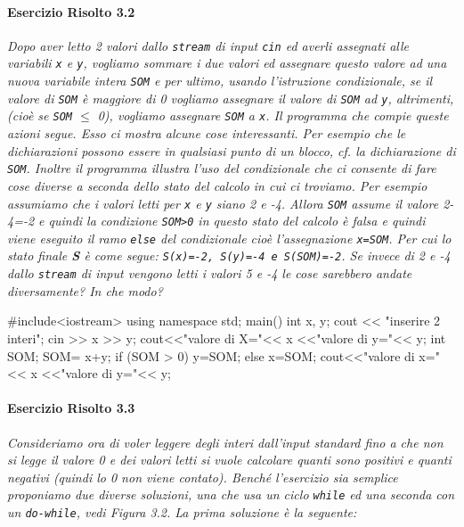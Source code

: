 \documentclass[a4paper,12pt]{book}
\begin{document}
\paragraph{Esercizio Risolto 3.2}
\textit{Dopo aver letto 2 valori dallo \texttt{stream} di input \texttt{cin} ed averli assegnati alle variabili \texttt{x} e \texttt{y}, vogliamo sommare i due valori ed assegnare questo valore ad una nuova variabile intera \texttt{SOM} e per ultimo, usando l'istruzione condizionale, se il valore di \texttt{SOM} è maggiore di 0 vogliamo assegnare il valore di \texttt{SOM} ad \texttt{y}, altrimenti, (cioè se \texttt{SOM} $\le$ 0), vogliamo assegnare \texttt{SOM} a \texttt{x}. Il programma che compie queste azioni segue. Esso ci mostra alcune cose interessanti.
Per esempio che le dichiarazioni possono essere in qualsiasi punto di un blocco, cf. la dichiarazione di \texttt{SOM}. Inoltre il programma illustra l'uso del condizionale che ci consente di fare cose diverse a seconda dello stato del calcolo in cui ci troviamo. Per esempio assumiamo che i valori letti per \texttt{x} e \texttt{y} siano 2 e -4. Allora \texttt{SOM} assume il valore 2-4=-2 e quindi la condizione \texttt{SOM>0} in questo stato del calcolo è falsa e quindi viene eseguito il ramo \texttt{else} del condizionale cioè l'assegnazione \texttt{x=SOM}. Per cui lo stato finale \textbf{S} è come segue: \texttt{S(x)=-2, S(y)=-4 e S(SOM)=-2}. Se invece di 2 e -4 dallo \texttt{stream} di input vengono letti i valori 5 e -4 le cose sarebbero andate diversamente? In che modo?}

\begin{codice}

#include<iostream> 
using namespace std; 
main() {
  int x, y; 
  cout << "inserire 2 interi"; 
  cin >> x >> y; 
  cout<<"valore di X="<< x <<"valore di y="<< y;
  int SOM; 
  SOM= x+y; 
  if (SOM > 0) 
    y=SOM;
  else
    x=SOM;
  cout<<"valore di x="<< x <<"valore di y="<< y;
}
\end{codice}

\paragraph{Esercizio Risolto 3.3}
\textit{Consideriamo ora di voler leggere degli interi dall'input standard fino a che non si legge il valore 0 e dei valori letti si vuole calcolare quanti sono positivi e quanti negativi (quindi lo 0 non viene contato). Benché l'esercizio sia semplice proponiamo due diverse soluzioni, una che usa un ciclo \texttt{while} ed una seconda con un \texttt{do-while}, vedi Figura 3.2. La prima soluzione è la seguente:}
\end{document}

